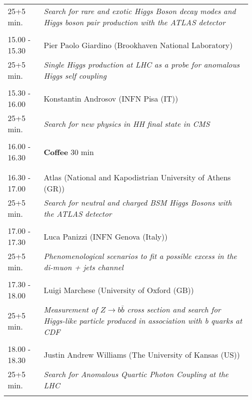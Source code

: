 \begin{longtable}{p{3cm}p{13cm}}
25+5 min. & {\it Search for rare and exotic Higgs Boson decay modes and Higgs boson pair production with the ATLAS detector}\\ 
 & \\ 
15.00 - 15.30 & Pier Paolo Giardino (Brookhaven National Laboratory)\\ 
25+5 min. & {\it Single Higgs production at LHC as a probe for anomalous Higgs self coupling}\\ 
 & \\ 
15.30 - 16.00 & Konstantin Androsov (INFN Pisa (IT))\\ 
25+5 min. & {\it Search for new physics in HH final state in CMS}\\ 
 & \\ 
16.00 - 16.30 & {\bf Coffee} \hfill 30 min \\ 
 & \\ 
 & \\ 
16.30 - 17.00 & Atlas (National and Kapodistrian University of Athens (GR))\\ 
25+5 min. & {\it Search for neutral and charged BSM Higgs Bosons with the ATLAS detector}\\ 
 & \\ 
17.00 - 17.30 & Luca Panizzi (INFN Genova (Italy))\\ 
25+5 min. & {\it Phenomenological scenarios to fit a possible excess in the di-muon + jets channel}\\ 
 & \\ 
17.30 - 18.00 & Luigi Marchese (University of Oxford (GB))\\ 
25+5 min. & {\it Measurement of $Z \rightarrow b\bar{b}$ cross section and search for Higgs-like particle produced in association with b quarks at CDF}\\ 
 & \\ 
18.00 - 18.30 & Justin Andrew Williams (The University of Kansas (US))\\ 
25+5 min. & {\it Search for Anomalous Quartic Photon Coupling at the LHC}\\ 
 & \\ 
\end{longtable}

